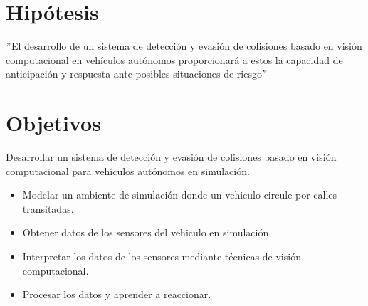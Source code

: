 \documentclass[10pt,letterpaper,final]{article}
\begin{document}
    \section*{Hipótesis}
    \("\)El desarrollo de un sistema de detección y evasión de colisiones basado en visión computacional en vehículos autónomos
    proporcionará a estos la capacidad de anticipación y respuesta ante posibles situaciones de riesgo\("\)
    
    \section*{Objetivos}
    \newline
    \noindent Desarrollar un sistema de detección y evasión de colisiones basado en visión computacional para vehículos autónomos en simulación.
    \newline
    \newline
    \begin{itemize}
        \item Modelar un ambiente de simulación donde un vehiculo circule por calles transitadas.
        \item Obtener datos de los sensores del vehiculo en simulación.
        \item Interpretar los datos de los sensores mediante técnicas de visión computacional.
        \item Procesar los datos y aprender a reaccionar.
    \end{itemize}
    \clearpage
\end{document}
